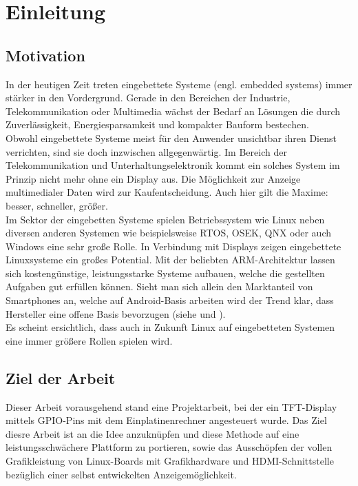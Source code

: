 
\chapter{Einleitung}
\label{cha:Einleitung}

\section{Motivation}
In der heutigen Zeit treten eingebettete Systeme (engl. embedded systems) immer stärker in den Vordergrund. Gerade in den Bereichen der Industrie, Telekommunikation oder Multimedia wächst der Bedarf an Lösungen die durch Zuverlässigkeit, Energiesparsamkeit und kompakter Bauform bestechen.\\
Obwohl eingebettete Systeme meist für den Anwender unsichtbar ihren Dienst verrichten, sind sie doch inzwischen allgegenwärtig. Im Bereich der Telekommunikation und Unterhaltungselektronik kommt ein solches System im Prinzip nicht mehr ohne ein Display aus. Die Möglichkeit zur Anzeige multimedialer Daten wird zur Kaufentscheidung. Auch hier gilt die Maxime: besser, schneller, größer.\\
Im Sektor der eingebetten Systeme spielen Betriebssystem wie Linux neben diversen anderen Systemen wie beispielsweise RTOS, OSEK, QNX oder auch Windows eine sehr große Rolle. In Verbindung mit Displays zeigen eingebettete Linuxsysteme ein großes Potential. Mit der beliebten ARM-Architektur lassen sich kostengünstige, leistungsstarke Systeme aufbauen, welche die gestellten Aufgaben gut erfüllen können. Sieht man sich allein den Marktanteil von Smartphones an, welche auf Android-Basis arbeiten wird der Trend klar, dass Hersteller eine offene Basis bevorzugen (siehe \cite{android2014} und \cite{Brandt2013}).\\
Es scheint ersichtlich, dass auch in Zukunft Linux auf eingebetteten Systemen eine immer größere Rollen spielen wird. 

\section{Ziel der Arbeit}
Dieser Arbeit vorausgehend stand eine Projektarbeit, bei der ein TFT-Display mittels GPIO-Pins mit dem Einplatinenrechner  angesteuert wurde. Das Ziel diesre Arbeit ist an die Idee anzuknüpfen und diese Methode auf eine leistungsschwächere Plattform zu portieren, sowie das Ausschöpfen der vollen Grafikleistung von Linux-Boards mit Grafikhardware und HDMI-Schnittstelle bezüglich einer selbst entwickelten Anzeigemöglichkeit.
